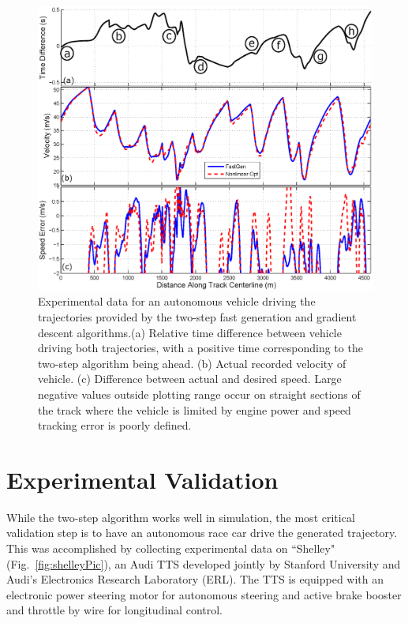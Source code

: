 \documentclass[twocolumn,10pt]{asme2ej}
\begin{document}
\begin{figure}
\centering
\includegraphics[width=6.5 in]{figures/expdata.eps}
\caption{Experimental data for an autonomous vehicle driving the trajectories provided by the two-step fast generation and gradient descent algorithms.(a) Relative time difference
between vehicle driving both trajectories, with a positive time corresponding to the two-step algorithm being ahead. (b) Actual
recorded velocity of vehicle. (c) Difference between actual and desired speed. Large negative values outside plotting range occur 
 on straight sections of the track where the vehicle is limited by engine power and speed tracking error is poorly defined.}
\label{fig:expdata}
\end{figure}

\section{Experimental Validation} 
\label{sec:EXP}
While the two-step algorithm works well in simulation, the most critical validation step is to have an
autonomous race car drive the generated trajectory. This was accomplished by collecting experimental data on ``Shelley" (Fig.~\ref{fig:shelleyPic}), an
Audi TTS developed jointly by Stanford University and Audi's Electronics Research Laboratory (ERL). The TTS is equipped 
with an electronic power steering motor for autonomous steering and active brake booster and throttle by wire for
longitudinal control. 
\end{document}

